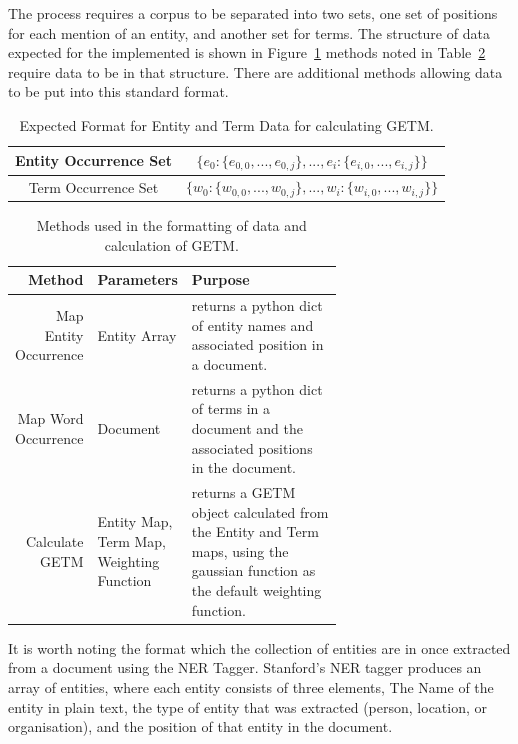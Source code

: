 \documentclass[10pt]{report}
\begin{document}
The process requires a corpus to be separated into two sets, one set of positions for each mention of an entity, and another set for terms. The structure of data expected for the implemented is shown in Figure~\ref{fig:getm_data} methods noted in Table~\ref{tab:getm_methods} require data to be in that structure. There are additional methods allowing data to be put into this standard format.

\renewcommand{\baselinestretch}{2.0}\normalsize

\begin{table}[h!]
\centering
  \begin{tabular}{c | c}
  Entity Occurrence Set & \( \{e_0 : \{e_{0,0}, ..., e_{0,j}\}, ..., e_i : \{e_{i,0}, ..., e_{i,j}\}\}\)\\
  \hline
  Term Occurrence Set & \( \{w_0 : \{w_{0,0}, ..., w_{0,j}\}, ..., w_i : \{w_{i,0}, ..., w_{i,j}\}\}\)
  \end{tabular}
  \caption{Expected Format for Entity and Term Data for calculating GETM.\label{fig:getm_data}}
\end{table}
\renewcommand{\baselinestretch}{1.0}\normalsize



\renewcommand{\baselinestretch}{1.0}\normalsize
\renewcommand{\arraystretch}{2.0}
\begin{table}[h!]
  \begin{tabular}{ r | p{0.15\linewidth} | p{0.5\linewidth}}
  
  Method & Parameters &Purpose\\
    \hline
    Map Entity Occurrence & Entity Array & returns a python dict of entity names and associated position in a document.\\ 
    Map Word Occurrence & Document & returns a python dict of terms in a document and the associated positions in the document.\\
    Calculate GETM &Entity Map, Term Map, Weighting Function & returns a GETM object calculated from the Entity and Term maps, using the gaussian function as the default weighting function.\\
    
  \end{tabular}
  \caption{Methods used in the formatting of data and calculation of GETM.\label{tab:getm_methods}}
\end{table}
\renewcommand{\baselinestretch}{2.0}\normalsize
\renewcommand{\arraystretch}{1.0}

It is worth noting the format which the collection of entities are in once extracted from a document using the NER Tagger. Stanford's NER tagger produces an array of entities, where each entity consists of three elements, The Name of the entity in plain text, the type of entity that was extracted (person, location, or organisation), and the position of that entity in the document. 
\end{document}
